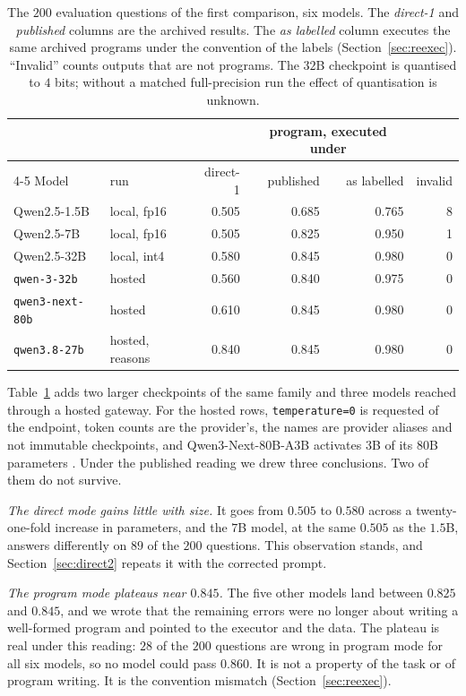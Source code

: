 \documentclass[11pt,a4paper]{article}
\newcommand{\code}[1]{\texttt{\small #1}}
\begin{document}
\begin{table}[ht]
\centering
\small
\begin{tabular}{llrrrr}
\toprule
 & & & \multicolumn{2}{c}{program, executed under} & \\
\cmidrule(lr){4-5}
Model & run & direct-1 & published & as labelled & invalid \\
\midrule
Qwen2.5-1.5B           & local, fp16  & 0.505 & 0.685 & 0.765 & 8 \\
Qwen2.5-7B             & local, fp16  & 0.505 & 0.825 & 0.950 & 1 \\
Qwen2.5-32B            & local, int4  & 0.580 & 0.845 & 0.980 & 0 \\
\code{qwen-3-32b}      & hosted       & 0.560 & 0.840 & 0.975 & 0 \\
\code{qwen3-next-80b}  & hosted       & 0.610 & 0.845 & 0.980 & 0 \\
\code{qwen3.8-27b}     & hosted, reasons & 0.840 & 0.845 & 0.980 & 0 \\
\bottomrule
\end{tabular}
\caption{The $200$ evaluation questions of the first comparison, six models.
The \emph{direct-1} and \emph{published} columns are the archived results.
The \emph{as labelled} column executes the same archived programs under the
convention of the labels (Section~\ref{sec:reexec}). ``Invalid'' counts
outputs that are not programs. The $32$B checkpoint is quantised to $4$ bits;
without a matched full-precision run the effect of quantisation is unknown.}
\label{tab:six}
\end{table}

Table~\ref{tab:six} adds two larger checkpoints of the same family and three
models reached through a hosted gateway. For the hosted rows,
\code{temperature=0} is requested of the endpoint, token counts are the
provider's, the names are provider aliases and not immutable checkpoints, and
Qwen3-Next-80B-A3B activates $3$B of its $80$B parameters \cite{qwen3next}.
Under the published reading we drew three conclusions. Two of them do not
survive.

\emph{The direct mode gains little with size.} It goes from $0.505$ to
$0.580$ across a twenty-one-fold increase in parameters, and the $7$B model,
at the same $0.505$ as the $1.5$B, answers differently on $89$ of the $200$
questions. This observation stands, and Section~\ref{sec:direct2} repeats it
with the corrected prompt.

\emph{The program mode plateaus near $0.845$.} The five other models
land between $0.825$ and $0.845$, and we wrote that the remaining errors
were no longer about writing a well-formed program and pointed to the
executor and the data. The plateau is real under this reading: $28$ of the
$200$ questions are wrong in program mode for all six models, so no model
could pass $0.860$. It is not a property of the task or of program writing.
It is the convention mismatch (Section~\ref{sec:reexec}).
\end{document}

